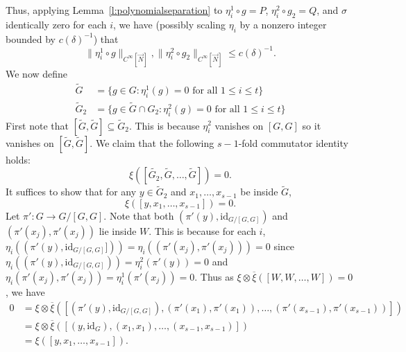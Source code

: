 \documentclass[11pt, a4paper]{amsart}
\theoremstyle{plain}
\theoremstyle{plain}
\theoremstyle{definition}
\theoremstyle{remark}
\numberwithin{equation}{section}
\numberwithin{lemma}{section}
\numberwithin{proposition}{section}
\numberwithin{corollary}{section}
\numberwithin{definition}{section}
\numberwithin{claim}{section}
\begin{document}
Thus, applying Lemma~\ref{l:polynomialseparation} to $\eta_i^1 \circ g = P$, $\eta_i^2 \circ g_2 = Q$, and $\sigma$ identically zero for each $i$, we have (possibly scaling $\eta_i$ by a nonzero integer bounded by $c(\delta)^{-1}$) that
$$\|\eta_i^1 \circ g\|_{C^\infty[\vec{N}]}, \|\eta_i^2 \circ g_2\|_{C^\infty[\vec{N}]} \le c(\delta)^{-1}.$$
We now define
\begin{align*}
\tilde{G} &= \{g \in G: \eta_i^1(g) = 0 \text{ for all } 1 \le i \le t\} \\
\tilde{G}_2 &= \{g \in \tilde{G} \cap G_2: \eta_i^2(g) = 0 \text{ for all } 1 \le i \le t\}
\end{align*}
First note that $[\tilde{G}, \tilde{G}] \subseteq \tilde{G}_2$. This is because $\eta_i^2$ vanishes on $[G, G]$ so it vanishes on $[\tilde{G}, \tilde{G}]$. We claim that the following $s - 1$-fold commutator identity holds: 
$$\xi([\tilde{G_2}, \tilde{G}, \dots, \tilde{G}]) = 0.$$
It suffices to show that for any $y \in \tilde{G}_2$ and $x_1, \dots, x_{s - 1}$ be inside $\tilde{G}$, 
$$\xi([y, x_1, \dots, x_{s - 1}]) = 0.$$
Let $\pi'\colon G \to G/[G, G]$. Note that both $(\pi'(y), \mathrm{id}_{G/[G,G]})$ and $(\pi'(x_j), \pi'(x_j))$ lie inside $W$. This is because for each $i$, $\eta_i((\pi'(y), \mathrm{id}_{G/[G,G]}])) = \eta_i((\pi'(x_j), \pi'(x_j))) = 0$ since $\eta_i((\pi'(y), \mathrm{id}_{G/[G, G]})) = \eta_i^2(\pi'(y)) = 0$ and $\eta_i(\pi'(x_j), \pi'(x_j)) = \eta_i^1(\pi'(x_j)) = 0$. Thus as $\xi \otimes \overline{\xi}([W, W, \dots, W]) = 0$, we have
\begin{align*}
0 &= \xi \otimes \overline{\xi}([(\pi'(y), \mathrm{id}_{G/[G,G]}), (\pi'(x_1), \pi'(x_1)), \dots, (\pi'(x_{s - 1}), \pi'(x_{s - 1}))]) \\
&= \xi \otimes \overline{\xi}([(y, \mathrm{id}_G), (x_1, x_1), \dots, (x_{s - 1}, x_{s - 1})]) \\
&= \xi([y, x_1, \dots, x_{s - 1}]).
\end{align*}
\end{document}
